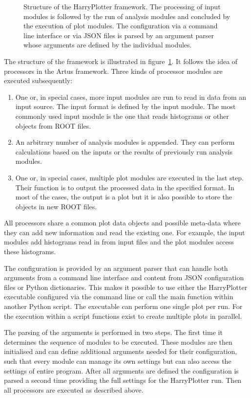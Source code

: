 \documentclass[a4paper, oneside, 10pt]{scrartcl}
\begin{document}
\begin{figure}[htb]
\centering 
\caption{Structure of the HarryPlotter framework. The processing of input modules is followed by the run of analysis modules and concluded by the execution of plot modules. The configuration via a command line interface or via JSON files is parsed by an argument parser whose arguments are defined by the individual modules.}
\label{figure_artus_harry_plotter}
\end{figure}

The structure of the framework is illustrated in figure~\ref{figure_artus_harry_plotter}. It follows the idea of processors in the Artus framework. Three kinds of processor modules are executed subsequently:
\begin{enumerate}
\item One or, in special cases, more input modules are run to read in data from an input source. The input format is defined by the input module. The most commonly used input module is the one that reads histograms or other objects from ROOT files.
\item An arbitrary number of analysis modules is appended. They can perform calculations based on the inputs or the results of previously run analysis modules.
\item One or, in special cases, multiple plot modules are executed in the last step. Their function is to output the processed data in the specified format. In most of the cases, the output is a plot but it is also possible to store the objects in new ROOT files.
\end{enumerate}
All processors share a common plot data objects and possible meta-data where they can add new information and read the existing one. For example, the input modules add histograms read in from input files and the plot modules access these histograms.

The configuration is provided by an argument parser that can handle both arguments from a command line interface and content from JSON configuration files or Python dictionaries. This makes it possible to use either the HarryPlotter executable configured via the command line or call the main function within another Python script. The executable can perform one single plot per run. For the execution within a script functions exist to create multiple plots in parallel.

The parsing of the arguments is performed in two steps. The first time it determines the sequence of modules to be executed. These modules are then initialised and can define additional arguments needed for their configuration, such that every module can manage its own settings but can also access the settings of entire program. After all arguments are defined the configuration is parsed a second time providing the full settings for the HarryPlotter run. Then all processors are executed as described above.
\end{document}
